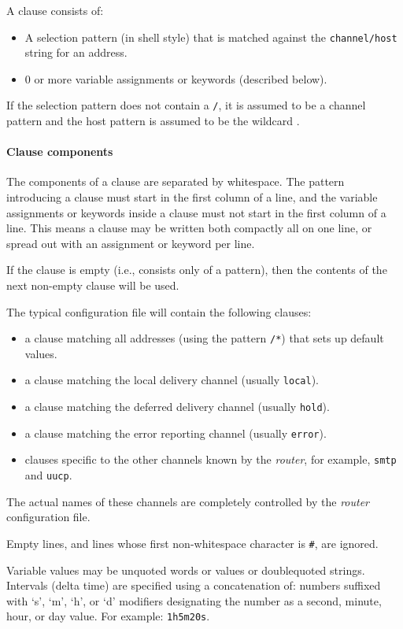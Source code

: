 A clause consists of:
\begin{itemize}
\item A selection pattern (in shell style) that is matched against the
{\tt channel/host} string for an address.
\item 0 or more variable assignments or keywords (described below).
\end{itemize}

If the selection pattern does not contain a {\tt /}, it is assumed to
be a channel pattern and the host pattern is assumed to be the wildcard
{\tt *}.




\paragraph{Clause components}

The components of a clause are separated by whitespace. The pattern
introducing a clause must start in the first column of a line, and the
variable assignments or keywords inside a clause must not start in the
first column of a line. This means a clause may be written both compactly
all on one line, or spread out with an assignment or keyword per line.

If the clause is empty (i.e., consists only of a pattern), then the
contents of the next non-empty clause will be used.

The typical configuration file will contain the following clauses:
\begin{itemize}
\item a clause matching all addresses (using the pattern {\tt */*})
that sets up default values.
\item a clause matching the local delivery channel (usually {\tt local}).
\item a clause matching the deferred delivery channel (usually {\tt hold}).
\item a clause matching the error reporting channel (usually {\tt error}).
\item clauses specific to the other channels known by the {\em router\/},
for example, {\tt smtp} and {\tt uucp}.
\end{itemize}

The actual names of these channels are completely controlled by the
{\em router\/} configuration file.

Empty lines, and lines whose first non-whitespace character is {\tt \#},
are ignored.

Variable values may be unquoted words or values or doublequoted strings.
Intervals (delta time) are specified using a concatenation of: numbers
suffixed with `s', `m', `h', or `d' modifiers designating the number as
a second, minute, hour, or day value. For example: {\tt 1h5m20s}.




